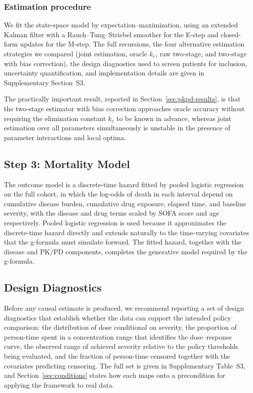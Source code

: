 \subsubsection*{Estimation procedure}
We fit the state-space model by expectation--maximization, using an extended Kalman filter with a
Rauch--Tung--Striebel smoother for the E-step and closed-form updates for the M-step. The full
recursions, the four alternative estimation strategies we compared (joint estimation, oracle $k_e$,
raw two-stage, and two-stage with bias correction), the design diagnostics used to screen patients for
inclusion, uncertainty quantification, and implementation details are given in Supplementary
Section~S3.

The practically important result, reported in Section~\ref{sec:pkpd-results}, is that the two-stage
estimator with bias correction approaches oracle accuracy without requiring the elimination constant
$k_e$ to be known in advance, whereas joint estimation over all parameters simultaneously is unstable
in the presence of parameter interactions and local optima.

\subsection{Step 3: Mortality Model}
The outcome model is a discrete-time hazard fitted by pooled logistic regression on the full cohort,
in which the log-odds of death in each interval depend on cumulative disease burden, cumulative drug
exposure, elapsed time, and baseline severity, with the disease and drug terms scaled by SOFA score and
age respectively. Pooled logistic regression is used because it approximates the discrete-time hazard
directly and extends naturally to the time-varying covariates that the g-formula must simulate forward.
The fitted hazard, together with the disease and PK/PD components, completes the generative model
required by the g-formula.

\subsection{Design Diagnostics}\label{sec:design_diagnostics}
Before any causal estimate is produced, we recommend reporting a set of design diagnostics that
establish whether the data can support the intended policy comparison: the distribution of dose
conditional on severity, the proportion of person-time spent in a concentration range that identifies
the dose--response curve, the observed range of achieved severity relative to the policy thresholds
being evaluated, and the fraction of person-time censored together with the covariates predicting
censoring. The full set is given in Supplementary Table~S3, and Section~\ref{sec:conditions} states
how each maps onto a precondition for applying the framework to real data.

